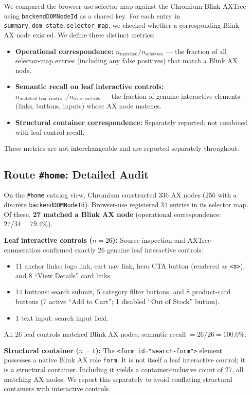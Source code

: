 \documentclass[conference]{IEEEtran}
\begin{document}
We compared the browser-use selector map against the Chromium Blink AXTree using \texttt{backendDOMNodeId} as a shared key. For each entry in \texttt{summary.dom\_state.selector\_map}, we checked whether a corresponding Blink AX node existed. We define three distinct metrics:
\begin{itemize}
    \item \textbf{Operational correspondence:} $n_{\mathrm{matched}} / n_{\mathrm{selectors}}$ — the fraction of all selector-map entries (including any false positives) that match a Blink AX node.
    \item \textbf{Semantic recall on leaf interactive controls:} $n_{\mathrm{matched\_true\_controls}} / n_{\mathrm{true\_controls}}$ — the fraction of genuine interactive elements (links, buttons, inputs) whose AX node matches.
    \item \textbf{Structural container correspondence:} Separately reported; not combined with leaf-control recall.
\end{itemize}
These metrics are not interchangeable and are reported separately throughout.

\subsection{Route \texttt{\#home}: Detailed Audit}

On the \texttt{\#home} catalog view, Chromium constructed 336 AX nodes (256 with a discrete \texttt{backendDOMNodeId}). Browser-use registered 34 entries in its selector map. Of these, \textbf{27 matched a Blink AX node} (operational correspondence: $27/34 = 79.4\%$).

\textbf{Leaf interactive controls ($n=26$):} Source inspection and AXTree enumeration confirmed exactly 26 genuine leaf interactive controls:
\begin{itemize}
    \item 11 anchor links: logo link, cart nav link, hero CTA button (rendered as \texttt{<a>}), and 8 ``View Details'' card links.
    \item 14 buttons: search submit, 5 category filter buttons, and 8 product-card buttons (7 active ``Add to Cart''; 1 disabled ``Out of Stock'' button).
    \item 1 text input: search input field.
\end{itemize}
All 26 leaf controls matched Blink AX nodes: semantic recall $= 26/26 = \mathbf{100.0\%}$.

\textbf{Structural container ($n=1$):} The \texttt{<form id="search-form">} element possesses a native Blink AX role \texttt{form}. It is not itself a leaf interactive control; it is a structural container. Including it yields a container-inclusive count of 27, all matching AX nodes. We report this separately to avoid conflating structural containers with interactive controls.
\end{document}
